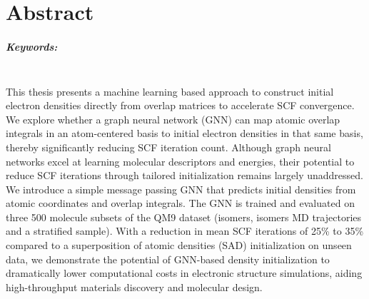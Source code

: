 \chapter*{Abstract}

\paragraph{Keywords:}
\mykeywordsabstract\\

This thesis presents a machine learning based approach to construct initial electron densities directly from overlap matrices to accelerate SCF convergence. We explore whether a graph neural network (GNN) can map atomic overlap integrals in an atom-centered basis to initial electron densities in that same basis, thereby significantly reducing SCF iteration count. Although graph neural networks excel at learning molecular descriptors and energies, their potential to reduce SCF iterations through tailored initialization remains largely unaddressed. We introduce a simple message passing GNN that predicts initial densities from atomic coordinates and overlap integrals. The GNN is trained and evaluated on three 500 molecule subsets of the QM9 dataset (isomers, isomers MD trajectories and a stratified sample). With a reduction in mean SCF iterations of 25\% to 35\% compared to a superposition of atomic densities (SAD) initialization on unseen data, we demonstrate the potential of GNN-based density initialization to dramatically lower computational costs in electronic structure simulations, aiding high-throughput materials discovery and molecular design.